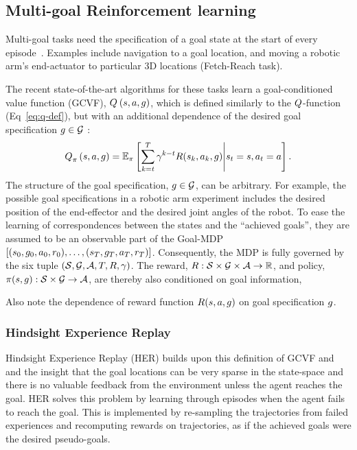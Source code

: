 \subsection{Multi-goal Reinforcement learning}
Multi-goal tasks need the specification of a goal state at the start of
every episode~\citep{plappert2018multi}. Examples include navigation to a
goal location, and moving a robotic arm's end-actuator to particular 3D
locations (Fetch-Reach task).

The recent state-of-the-art algorithms for these tasks learn a goal-conditioned value
function (GCVF), $Q_{}^{}\left({s}, {a}, {g}\right)$, which is defined
similarly to the
$Q$-function (Eq~\ref{eq:q-def}), but with an additional dependence of
the desired goal specification $g \in \mathcal{G}$ :
%
\begin{align}
Q_{\pi}^{}\left({s}, {a}, {g}\right) = \mathbb{E}_\pi\left[ \sum_{k=t}^T
  \gamma^{k-t} R(s_k, a_k, g)
  \middle| s_t = s, a_t = a \right] .
  \label{eq:q-def}
\end{align}%
%
The structure of the goal specification, $g \in \mathcal{G}$, can be
arbitrary. For example, the possible goal specifications in a robotic
arm experiment includes
the desired position of the end-effector and the desired joint
angles of the robot.  To ease the learning of correspondences between the states and
the ``achieved goals'', they are assumed to be an observable part of the
Goal-MDP $[(s_0, g_0, a_0, r_0), \dots, (s_T,
g_T, a_T, r_T)]$. Consequently, the MDP is fully governed by
the six tuple $(\mathcal{S}, \mathcal{G}, \mathcal{A}, T, R, \gamma)$. The
reward, $R : \mathcal{S} \times \mathcal{G} \times \mathcal{A}  \rightarrow \mathbb{R} $, and policy,
$\pi(s, g): \mathcal{S} \times \mathcal{G} \rightarrow \mathcal{A} $, are thereby also conditioned on goal information,  

Also note the dependence of reward function $R(s, a, g)$ on goal
specification $g$.

\subsubsection{Hindsight Experience Replay}
Hindsight Experience Replay (HER) builds upon this definition of GCVF
and and the insight that the goal locations can be very sparse in the
state-space and there is no valuable feedback from the environment unless the
agent reaches the goal.
HER solves this problem by learning through episodes when the agent fails to
reach the goal. This is implemented by re-sampling the trajectories from failed
experiences and recomputing rewards on trajectories, as if the achieved
goals were the desired pseudo-goals.


